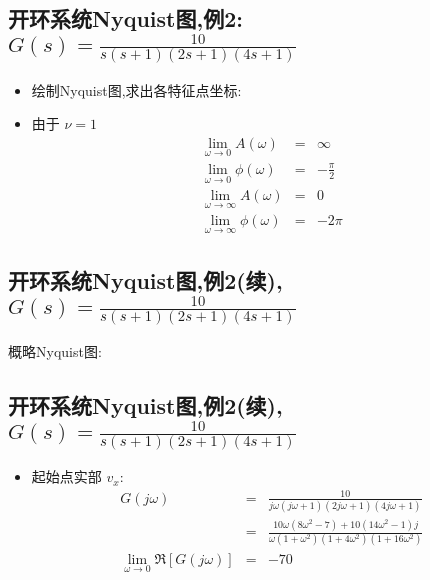 \documentclass[table]{article}
\begin{document}
\subsection{开环系统Nyquist图,例2:\(G(s)=\frac{10}{s(s+1)(2s+1)(4s+1)}\)}
\label{sec:org0aa4087}
\begin{itemize}
\item 绘制Nyquist图,求出各特征点坐标:
\item 由于  \(\nu = 1\) 
\begin{eqnarray*}
\lim_{\omega\rightarrow 0} A(\omega) & = & \infty\\
\lim_{\omega\rightarrow 0} \phi(\omega)&=&-\frac{\pi}{2} \\
\lim_{\omega\rightarrow\infty} A(\omega)&=&0 \\
\lim_{\omega\rightarrow\infty} \phi(\omega)&=& -2\pi 
\end{eqnarray*}
\end{itemize}
\subsection{开环系统Nyquist图,例2(续),\(G(s)=\frac{10}{s(s+1)(2s+1)(4s+1)}\)}
\label{sec:org323bddd}
概略Nyquist图:

\begin{center}
\end{center}
\subsection{开环系统Nyquist图,例2(续),\(G(s)=\frac{10}{s(s+1)(2s+1)(4s+1)}\)}
\label{sec:orgbd5b4cc}
\begin{itemize}
\item 起始点实部  \(v_x\):
\begin{eqnarray*}
G(j\omega) & = & \frac{10}{j\omega(j\omega+1)(2j\omega+1)(4j\omega+1)}\\
   &=& \frac{10\omega(8\omega^2-7)+10(14\omega^2-1)j}{\omega(1+\omega^2)(1+4\omega^2)(1+16\omega^2)}\\
\lim_{\omega\rightarrow 0}\Re[G(j\omega)] &=&-70
\end{eqnarray*}
\end{itemize}
\end{document}
